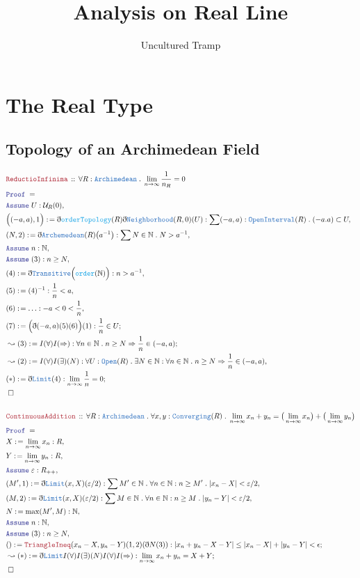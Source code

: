 \documentclass[12pt]{scrartcl}
\author{Uncultured Tramp}
\title{Analysis on Real Line}
\newcommand{\TYPE}[1]{\textcolor{NavyBlue}{\mathtt{#1}}}
\newcommand{\FUNC}[1]{\textcolor{Cerulean}{\mathtt{#1}}}
\newcommand{\LOGIC}[1]{\textcolor{Blue}{\mathtt{#1}}}
\newcommand{\THM}[1]{\textcolor{Maroon}{\mathtt{#1}}}
\renewcommand{\.}{\; . \;}
\newcommand{\de}{: \kern 0.1pc =}
\newcommand{\Theorem}[2]{& \THM{#1} \, :: \, #2 \\ & \Proof = \\ }
\newcommand{\Page}[1]{ \begin{align*} #1 \end{align*}   }
\newcommand{ \bd }{ \ByDef }
\newcommand{\Nat}{\mathbb{N} }
\newcommand{\Say}[3]{& #1 \de #2 : #3, \\}
\newcommand{\Conclude}[3]{& #1 \de #2 : #3; \\}
\newcommand{\Derive}[3]{& \leadsto #1 \de #2 : #3, \\}
\newcommand{\DeriveConclude}[3]{& \leadsto #1 \de #2 : #3 ; \\}
\newcommand{\Assume}[2]{& \LOGIC{Assume} \;#1 : #2, \\}
\newcommand{\QED}{\; \square}
\newcommand{\EndProof}{& \QED \\}
\newcommand{\ByDef}{\eth}
\newcommand{\Proof}{\LOGIC{Proof} \; }
\begin{document}
\maketitle
\newpage
\tableofcontents
\newpage
\section{The Real Type}
\subsection{Topology of an Archimedean Field }
\Page{
	\Theorem{ReductioInfinima}{\forall R : \TYPE{Archimedean} \. \lim_{n \to \infty} \frac{1}{n_R} = 0 }
	\Assume{U}{\mathcal{U}_R(0)}
	\Say{\Big((-a,a),1\Big)}{\bd \FUNC{orderTopology}(R)\bd \TYPE{Neighborhood}(R,0)(U)}
	{ \sum (-a,a) : \TYPE{OpenInterval}(R) \. (-a.a) \subset U  }
	\Say{ (N,2)  }{\bd \TYPE{Archemedean}(R)\big(a^{-1}\big)}{ \sum N \in \Nat \. N > a^{-1}  }
	\Assume{n}{\Nat}
	\Assume{(3)}{n \ge N}
	\Say{(4)}{\bd \TYPE{Transitive}\Big( \FUNC{order}(\Nat) \Big)}{ n > a^{-1} }
	\Say{(5)}{ (4)^{-1}}{ \frac{1}{n} < a}
	\Say{(6)}{ \ldots   }{ -a < 0 < \frac{1}{n} }
	\Conclude{(7)}{ \Big(\bd(-a,a)(5)(6)\Big)(1) }{  \frac{1}{n} \in U }
	\DeriveConclude{(3)}{ I(\forall)I(\Rightarrow)  }{\forall n  \in \Nat \. n \ge N \Rightarrow \frac{1}{n} \in (-a,a)  }
	\Derive{(2)}{I(\forall)I(\exists)(N)}
	{\forall U : \TYPE{Open}(R) \. \exists N \in \Nat : \forall n \in \Nat \. n \ge N  
		\Rightarrow \frac{1}{n} \in (-a,a)
	}
	\Conclude{(*)}{\bd \TYPE{Limit}(4)}{\lim_{n \to \infty} \frac{1}{n} = 0}
	\EndProof
	\\
	\Theorem{ContinuousAddition}{\forall R : \TYPE{Archimedean} \. \forall x,y : \TYPE{Converging}(R) \.
		\lim_{n \to \infty} x_n + y_n = \big(\lim_{n \to \infty} x_n \big) + \big( \lim_{n \to \infty} y_n \big)
	}
	\Say{X}{\lim_{n \to \infty} x_n}{R}
	\Say{Y}{\lim_{n \to \infty} y_n}{R}
	\Assume{\varepsilon}{R_{++}}
	\Say{(M',1)}{\bd \TYPE{Limit}(x,X)(\varepsilon/2)}{\sum M' \in \Nat \. \forall n \in \Nat : n \ge M' \. 
		|x_n - X| < \varepsilon/2}
	\Say{(M,2)}{\bd \TYPE{Limit}(x,X)(\varepsilon/2)}{\sum M \in \Nat \. \forall n \in \Nat : n \ge M \. 
		|y_n - Y| < \varepsilon/2}
	\Say{N}{\max(M',M)}{\Nat}
	\Assume{n}{\Nat}
	\Assume{(3)}{ n \ge N }
	\Conclude{()}{ \THM{TriangleIneq}(x_n - X,y_n - Y)(1,2)(\bd N(3))  }
	{ | x_n + y_n - X  - Y| \le |x_n - X| + |y_n - Y| < \epsilon }
	\DeriveConclude{(*)}{\bd \TYPE{Limit}I(\forall)I(\exists)(N)I(\forall)I(\Rightarrow)}
	{\lim_{n \to \infty} x_n + y_n = X + Y}
	\EndProof
}
\end{document}
